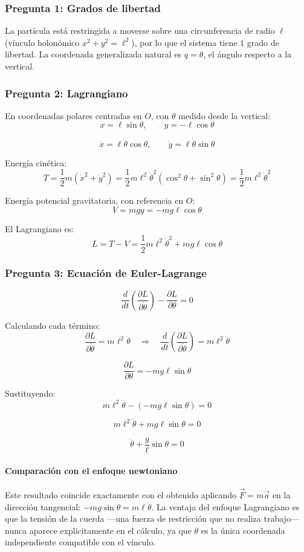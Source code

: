 \begin{sol}

\subsubsection*{Pregunta 1: Grados de libertad}

La partícula está restringida a moverse sobre una circunferencia de radio $\ell$ (vínculo holonómico $x^2+y^2=\ell^2$), por lo que el sistema tiene $1$ grado de libertad. La coordenada generalizada natural es $q = \theta$, el ángulo respecto a la vertical.

\subsubsection*{Pregunta 2: Lagrangiano}

En coordenadas polares centradas en $O$, con $\theta$ medido desde la vertical:
$$x = \ell\sin\theta, \qquad y = -\ell\cos\theta$$

$$\dot{x} = \ell\dot\theta\cos\theta, \qquad \dot{y} = \ell\dot\theta\sin\theta$$

Energía cinética:
$$T = \frac{1}{2}m(\dot{x}^2+\dot{y}^2) = \frac{1}{2}m\ell^2\dot\theta^2\left(\cos^2\theta+\sin^2\theta\right) = \frac{1}{2}m\ell^2\dot\theta^2$$

Energía potencial gravitatoria, con referencia en $O$:
$$V = mgy = -mg\ell\cos\theta$$

El Lagrangiano es:
$$\boxed{L = T - V = \frac{1}{2}m\ell^2\dot\theta^2 + mg\ell\cos\theta}$$

\subsubsection*{Pregunta 3: Ecuación de Euler-Lagrange}

$$\frac{d}{dt}\left(\frac{\partial L}{\partial\dot\theta}\right) - \frac{\partial L}{\partial\theta} = 0$$

Calculando cada término:
$$\frac{\partial L}{\partial\dot\theta} = m\ell^2\dot\theta \quad\Rightarrow\quad \frac{d}{dt}\left(\frac{\partial L}{\partial\dot\theta}\right) = m\ell^2\ddot\theta$$

$$\frac{\partial L}{\partial\theta} = -mg\ell\sin\theta$$

Sustituyendo:
$$m\ell^2\ddot\theta - (-mg\ell\sin\theta) = 0$$

$$m\ell^2\ddot\theta + mg\ell\sin\theta = 0$$

$$\boxed{\ddot\theta + \frac{g}{\ell}\sin\theta = 0}$$

\paragraph{Comparación con el enfoque newtoniano} Este resultado coincide exactamente con el obtenido aplicando $\vec{F}=m\vec{a}$ en la dirección tangencial: $-mg\sin\theta = m\ell\ddot\theta$. La ventaja del enfoque Lagrangiano es que la tensión de la cuerda —una fuerza de restricción que no realiza trabajo— nunca aparece explícitamente en el cálculo, ya que $\theta$ es la única coordenada independiente compatible con el vínculo.

\end{sol}
